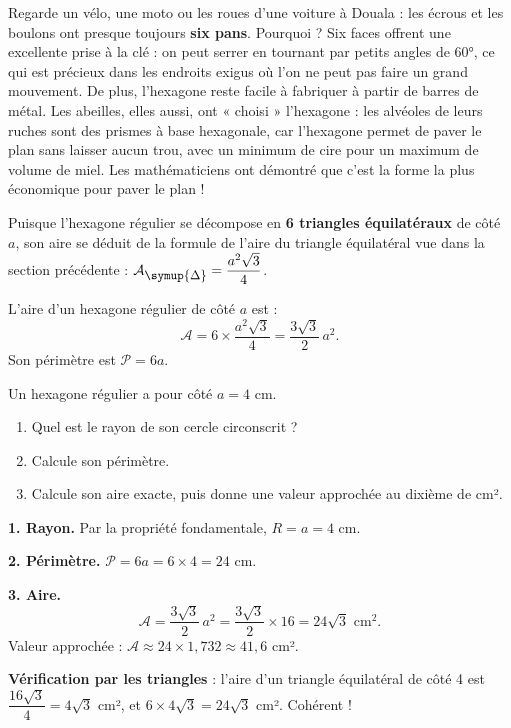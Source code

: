 \documentclass[11pt]{article}
\newcounter{popsec}
\newcounter{popsub}
\newcommand{\courssub}[1]{%
  \stepcounter{popsub}%
  \par\vspace{9pt}\noindent{\popxbold\fontsize{11.5}{13}\selectfont\color{popink}{\color{poporange}\thepopsec.\thepopsub}\hspace{6pt}#1}\par\nopagebreak\vspace{4pt}
}
\def\triangle{\mathord{\scalebox{0.9}{$\symup{\Delta}$}}}%
\begin{document}
\begin{savaistu}
Regarde un vélo, une moto ou les roues d'une voiture à Douala : les écrous et les boulons ont presque toujours \textbf{six pans}. Pourquoi ? Six faces offrent une excellente prise à la clé : on peut serrer en tournant par petits angles de $60°$, ce qui est précieux dans les endroits exigus où l'on ne peut pas faire un grand mouvement. De plus, l'hexagone reste facile à fabriquer à partir de barres de métal. Les abeilles, elles aussi, ont « choisi » l'hexagone : les alvéoles de leurs ruches sont des prismes à base hexagonale, car l'hexagone permet de paver le plan sans laisser aucun trou, avec un minimum de cire pour un maximum de volume de miel. Les mathématiciens ont démontré que c'est la forme la plus économique pour paver le plan !
\end{savaistu}

\courssub{Aire de l'hexagone régulier}

Puisque l'hexagone régulier se décompose en \textbf{6 triangles équilatéraux} de côté $a$, son aire se déduit de la formule de l'aire du triangle équilatéral vue dans la section précédente : $\mathcal{A}_{\triangle} = \dfrac{a^2\sqrt{3}}{4}$.

\begin{propriete}
L'aire d'un hexagone régulier de côté $a$ est :
\[ \mathcal{A} = 6 \times \frac{a^2\sqrt{3}}{4} = \frac{3\sqrt{3}}{2}\,a^2. \]
Son périmètre est $\mathcal{P} = 6a$.
\end{propriete}

\begin{exoresolu}
Un hexagone régulier a pour côté $a = 4$ cm.
\begin{enumerate}
\item Quel est le rayon de son cercle circonscrit ?
\item Calcule son périmètre.
\item Calcule son aire exacte, puis donne une valeur approchée au dixième de cm².
\end{enumerate}
\tcblower
\textbf{1. Rayon.} Par la propriété fondamentale, $R = a = 4$ cm.

\textbf{2. Périmètre.} $\mathcal{P} = 6a = 6 \times 4 = 24$ cm.

\textbf{3. Aire.}
\[ \mathcal{A} = \frac{3\sqrt{3}}{2}\,a^2 = \frac{3\sqrt{3}}{2} \times 16 = 24\sqrt{3} \text{ cm}^2. \]
Valeur approchée : $\mathcal{A} \approx 24 \times 1,732 \approx 41,6$ cm².

\textbf{Vérification par les triangles} : l'aire d'un triangle équilatéral de côté 4 est $\dfrac{16\sqrt{3}}{4} = 4\sqrt{3}$ cm², et $6 \times 4\sqrt{3} = 24\sqrt{3}$ cm². Cohérent !
\end{exoresolu}
\end{document}

